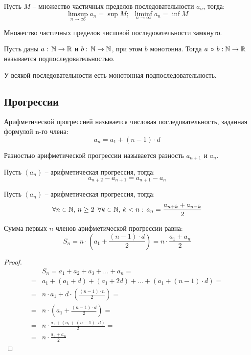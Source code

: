 \documentclass[12pt]{article}
\begin{document}
\begin{theorem}
    Пусть $M$ -- множество частичных пределов последовательности $a_n$, тогда:
    $$\limsup_{n\to\infty}a_n=\sup M;\enspace\liminf_{n\to\infty}a_n=\inf M$$
\end{theorem}
\begin{theorem}
    Множество частичных пределов числовой последовательности замкнуто.
\end{theorem}
\begin{definition}
    Пусть даны $a:\,\mathbb{N}\to\mathbb{R}$ и $b:\,\mathbb{N}\to\mathbb{N}$, при этом $b$ монотонна. Тогда $a\,\circ\, b:\\\mathbb{N}\to\mathbb{R}$ называется подпоследовательностью.
\end{definition}
\begin{statement}
    У всякой последовательности есть монотонная подпоследовательность.
\end{statement}

\subsection{Прогрессии}

\begin{definition}
    Арифметической прогрессией называется числовая последовательность, заданная формулой n-го члена:
    $$a_n=a_1+(n-1)\cdot d$$
\end{definition}

\begin{definition}
    Разностью арифметической прогрессии называется разность $a_{n+1}$ и $a_n$.
\end{definition}

\begin{statement}
    Пусть $(a_n)$ -- арифметическая прогрессия, тогда:
    $$a_{n+2}-a_{n+1}=a_{n+1}-a_n$$
\end{statement}

\begin{statement}
    Пусть $(a_n)$ -- арифметическая прогрессия, тогда:
    $$\forall n \in \mathbb{N},\,n\geq 2 \enspace\forall k \in \mathbb{N},\, k<n:\, a_n=\frac{a_{n+k}+a_{n-k}}{2}$$
\end{statement}

\begin{theorem}
    Сумма первых $n$ членов арифметической прогрессии равна:
    $$S_n=n\cdot \left(a_1+\frac{(n-1)\cdot d}{2} \right)=n \cdot \frac{a_1 + a_n}{2}$$
\end{theorem}

\begin{proof}
    \begin{align*}
        &S_n=a_1+a_2+a_3+\ldots+a_n=\\
        =&a_1+(a_1+d)+(a_1+2d)+\ldots+(a_1+(n-1)\cdot d)=\\
        =&n\cdot a_1+d\cdot \left( \frac{(n-1)\cdot n}{2} \right)=\\
        =&n\cdot \left(a_1+\frac{(n-1)\cdot d}{2} \right)=\\
        =&n \cdot \frac{a_1 + (a_1 + (n-1)\cdot d)}{2}=\\
        =&n\cdot \frac{a_1 + a_n}{2}
    \end{align*}
\end{proof}
\end{document}
